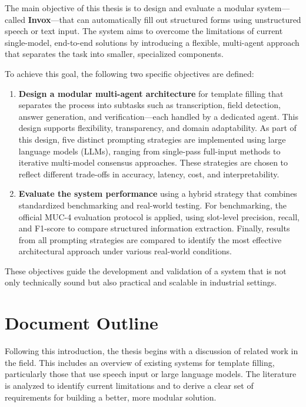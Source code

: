 The main objective of this thesis is to design and evaluate a modular system—called \textbf{Invox}—that can automatically fill out structured forms using unstructured speech or text input. The system aims to overcome the limitations of current single-model, end-to-end solutions by introducing a flexible, multi-agent approach that separates the task into smaller, specialized components.

To achieve this goal, the following two specific objectives are defined:

\begin{enumerate}
    \item \textbf{Design a modular multi-agent architecture} for template filling that separates the process into subtasks such as transcription, field detection, answer generation, and verification—each handled by a dedicated agent. This design supports flexibility, transparency, and domain adaptability. As part of this design, five distinct prompting strategies are implemented using large language models (LLMs), ranging from single-pass full-input methods to iterative multi-model consensus approaches. These strategies are chosen to reflect different trade-offs in accuracy, latency, cost, and interpretability.

    \item \textbf{Evaluate the system performance} using a hybrid strategy that combines standardized benchmarking and real-world testing. For benchmarking, the official MUC-4 evaluation protocol \cite{chinchor1992muc4} is applied, using slot-level precision, recall, and F1-score to compare structured information extraction. Finally, results from all prompting strategies are compared to identify the most effective architectural approach under various real-world conditions.
\end{enumerate}

These objectives guide the development and validation of a system that is not only technically sound but also practical and scalable in industrial settings.


\section{Document Outline}

Following this introduction, the thesis begins with a discussion of related work in the field. This includes an overview of existing systems for template filling, particularly those that use speech input or large language models. The literature is analyzed to identify current limitations and to derive a clear set of requirements for building a better, more modular solution.

